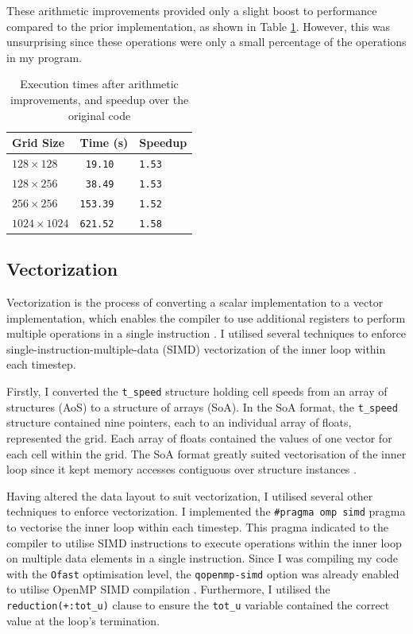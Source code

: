 \documentclass[twocolumn, a4paper]{article}
\begin{document}
These arithmetic improvements provided only a slight boost to performance compared to the prior implementation, as shown in Table \ref{tab:arithmetic_improvements}.
However, this was unsurprising since these operations were only a small percentage of the operations in my program.

\begin{table}[htbp]
  \begin{center}
  \caption{Execution times after arithmetic improvements, and speedup over the original code}\label{tab:arithmetic_improvements}
  \begin{tabular}{l | l l} 
      \hline\hline
      Grid Size&Time (s)&Speedup\\
      \hline
      $128 \times 128$&\texttt{ 19.10}&\texttt{1.53}\\
      $128 \times 256$&\texttt{ 38.49}&\texttt{1.53}\\
      $256 \times 256$&\texttt{153.39}&\texttt{1.52}\\
      $1024 \times 1024$&\texttt{621.52}&\texttt{1.58}\\
      \hline
    \end{tabular}
  \end{center}
\end{table}

\subsection{Vectorization}

Vectorization is the process of converting a scalar implementation to a vector implementation, which enables the compiler to use additional registers to perform multiple operations in a single instruction \cite{vectorization}.
I utilised several techniques to enforce single-instruction-multiple-data (SIMD) vectorization of the inner loop within each timestep.

Firstly, I converted the \texttt{t\_speed} structure holding cell speeds from an array of structures (AoS) to a structure of arrays (SoA).
In the SoA format, the \texttt{t\_speed} structure contained nine pointers, each to an individual array of floats, represented the grid.
Each array of floats contained the values of one vector for each cell within the grid.
The SoA format greatly suited vectorisation of the inner loop since it kept memory accesses contiguous over structure instances \cite{soa}.

Having altered the data layout to suit vectorization, I utilised several other techniques to enforce vectorization.
I implemented the \texttt{\#pragma omp simd} pragma to vectorise the inner loop within each timestep.
This pragma indicated to the compiler to utilise SIMD instructions to execute operations within the inner loop on multiple data elements in a single instruction.
Since I was compiling my code with the \texttt{Ofast} optimisation level, the \texttt{qopenmp-simd} option was already enabled to utilise OpenMP SIMD compilation \cite{icc}.
Furthermore, I utilised the \texttt{reduction(+:tot\_u)} clause to ensure the \texttt{tot\_u} variable contained the correct value at the loop's termination.
\end{document}
